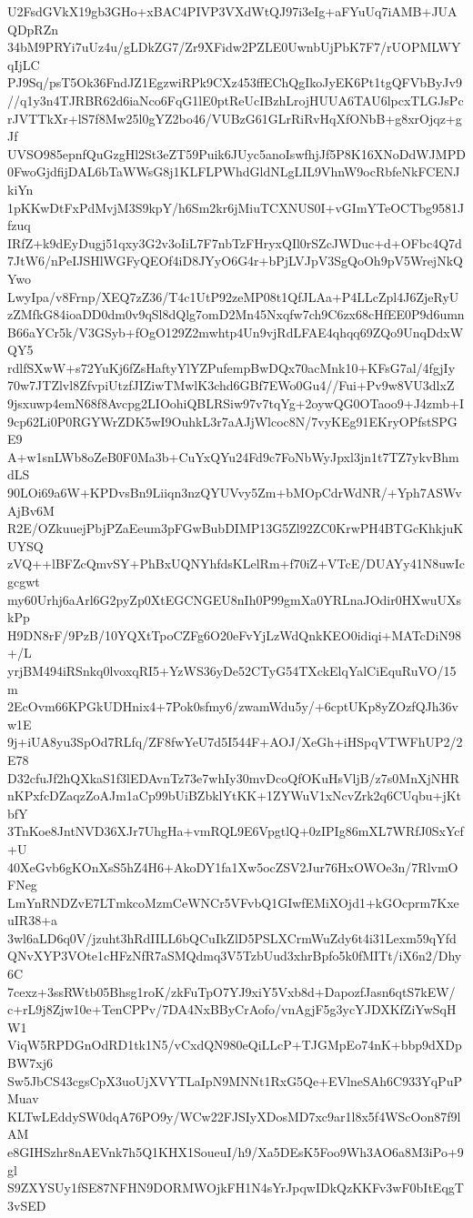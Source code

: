 U2FsdGVkX19gb3GHo+xBAC4PIVP3VXdWtQJ97i3eIg+aFYuUq7iAMB+JUAQDpRZn
34bM9PRYi7uUz4u/gLDkZG7/Zr9XFidw2PZLE0UwnbUjPbK7F7/rUOPMLWYqIjLC
PJ9Sq/psT5Ok36FndJZ1EgzwiRPk9CXz453ffEChQgIkoJyEK6Pt1tgQFVbByJv9
//q1y3n4TJRBR62d6iaNco6FqG1lE0ptReUcIBzhLrojHUUA6TAU6lpcxTLGJsPc
rJVTTkXr+lS7f8Mw25l0gYZ2bo46/VUBzG61GLrRiRvHqXfONbB+g8xrOjqz+gJf
UVSO985epnfQuGzgHl2St3eZT59Puik6JUyc5anoIswfhjJf5P8K16XNoDdWJMPD
0FwoGjdfijDAL6bTaWWsG8j1KLFLPWhdGldNLgLIL9VhnW9ocRbfeNkFCENJkiYn
1pKKwDtFxPdMvjM3S9kpY/h6Sm2kr6jMiuTCXNUS0I+vGImYTeOCTbg9581Jfzuq
IRfZ+k9dEyDugj51qxy3G2v3oIiL7F7nbTzFHryxQIl0rSZcJWDuc+d+OFbc4Q7d
7JtW6/nPeIJSHlWGFyQEOf4iD8JYyO6G4r+bPjLVJpV3SgQoOh9pV5WrejNkQYwo
LwyIpa/v8Frnp/XEQ7zZ36/T4c1UtP92zeMP08t1QfJLAa+P4LLcZpl4J6ZjeRyU
zZMfkG84ioaDD0dm0v9qSl8dQlg7omD2Mn45Nxqfw7ch9C6zx68cHfEE0P9d6umn
B66aYCr5k/V3GSyb+fOgO129Z2mwhtp4Un9vjRdLFAE4qhqq69ZQo9UnqDdxWQY5
rdlfSXwW+s72YuKj6fZsHaftyYlYZPufempBwDQx70acMnk10+KFsG7al/4fgjIy
70w7JTZlvl8ZfvpiUtzfJIZiwTMwlK3chd6GBf7EWo0Gu4//Fui+Pv9w8VU3dlxZ
9jsxuwp4emN68f8Avcpg2LIOohiQBLRSiw97v7tqYg+2oywQG0OTaoo9+J4zmb+I
9cp62Li0P0RGYWrZDK5wI9OuhkL3r7aAJjWlcoc8N/7vyKEg91EKryOPfstSPGE9
A+w1snLWb8oZeB0F0Ma3b+CuYxQYu24Fd9c7FoNbWyJpxl3jn1t7TZ7ykvBhmdLS
90LOi69a6W+KPDvsBn9Liiqn3nzQYUVvy5Zm+bMOpCdrWdNR/+Yph7ASWvAjBv6M
R2E/OZkuuejPbjPZaEeum3pFGwBubDIMP13G5Zl92ZC0KrwPH4BTGcKhkjuKUYSQ
zVQ++lBFZcQmvSY+PhBxUQNYhfdsKLelRm+f70iZ+VTcE/DUAYy41N8uwIcgcgwt
my60Urhj6aArl6G2pyZp0XtEGCNGEU8nIh0P99gmXa0YRLnaJOdir0HXwuUXskPp
H9DN8rF/9PzB/10YQXtTpoCZFg6O20eFvYjLzWdQnkKEO0idiqi+MATcDiN98+/L
yrjBM494iRSnkq0lvoxqRI5+YzWS36yDe52CTyG54TXckElqYalCiEquRuVO/15m
2EcOvm66KPGkUDHnix4+7Pok0sfmy6/zwamWdu5y/+6cptUKp8yZOzfQJh36vw1E
9j+iUA8yu3SpOd7RLfq/ZF8fwYeU7d5I544F+AOJ/XeGh+iHSpqVTWFhUP2/2E78
D32cfuJf2hQXkaS1f3lEDAvnTz73e7whIy30mvDcoQfOKuHsVljB/z7s0MnXjNHR
nKPxfcDZaqzZoAJm1aCp99bUiBZbklYtKK+1ZYWuV1xNcvZrk2q6CUqbu+jKtbfY
3TnKoe8JntNVD36XJr7UhgHa+vmRQL9E6VpgtlQ+0zIPIg86mXL7WRfJ0SxYcf+U
40XeGvb6gKOnXsS5hZ4H6+AkoDY1fa1Xw5ocZSV2Jur76HxOWOe3n/7RlvmOFNeg
LmYnRNDZvE7LTmkcoMzmCeWNCr5VFvbQ1GIwfEMiXOjd1+kGOcprm7KxeuIR38+a
3wl6aLD6q0V/jzuht3hRdIILL6bQCuIkZlD5PSLXCrmWuZdy6t4i31Lexm59qYfd
QNvXYP3VOte1cHFzNfR7aSMQdmq3V5TzbUud3xhrBpfo5k0fMITt/iX6n2/Dhy6C
7cexz+3ssRWtb05Bhsg1roK/zkFuTpO7YJ9xiY5Vxb8d+DapozfJasn6qtS7kEW/
c+rL9j8Zjw10e+TenCPPv/7DA4NxBByCrAofo/vnAgjF5g3ycYJDXKfZiYwSqHW1
ViqW5RPDGnOdRD1tk1N5/vCxdQN980eQiLLcP+TJGMpEo74nK+bbp9dXDpBW7xj6
Sw5JbCS43cgsCpX3uoUjXVYTLaIpN9MNNt1RxG5Qe+EVlneSAh6C933YqPuPMuav
KLTwLEddySW0dqA76PO9y/WCw22FJSIyXDosMD7xc9ar1l8x5f4WScOon87f9lAM
e8GIHSzhr8nAEVnk7h5Q1KHX1SoueuI/h9/Xa5DEsK5Foo9Wh3AO6a8M3iPo+9gl
S9ZXYSUy1fSE87NFHN9DORMWOjkFH1N4sYrJpqwIDkQzKKFv3wF0bItEqgT3vSED
